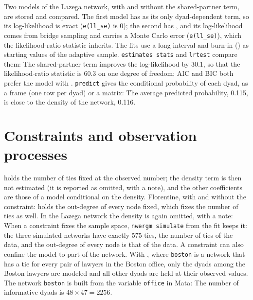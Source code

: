 Two models of the Lazega network, with and without the shared-partner term, are stored and compared. The first model has  as its only dyad-dependent term, so its log-likelihood is exact (\texttt{e(ll\_se)} is 0); the second has , and its log-likelihood comes from bridge sampling and carries a Monte Carlo error (\texttt{e(ll\_se)}), which the likelihood-ratio statistic inherits. The fits use a long interval and burn-in () as starting values of the adaptive sample.
\texttt{estimates stats} and \texttt{lrtest} compare them:
The shared-partner term improves the log-likelihood by 30.1, so that the likelihood-ratio statistic is 60.3 on one degree of freedom; AIC and BIC both prefer the model with . \texttt{predict} gives the conditional probability of each dyad, as a frame (one row per dyad) or a matrix:
The average predicted probability, 0.115, is close to the density of the network, 0.116.

\section{Constraints and observation processes}\label{sec:conex}

 holds the number of ties fixed at the observed number; the density term is then not estimated (it is reported as omitted, with a note), and the other coefficients are those of a model conditional on the density. Florentine, with and without the constraint:
 holds the out-degree of every node fixed, which fixes the number of ties as well. In the Lazega network the density is again omitted, with a note:
When a constraint fixes the sample space, \texttt{nwergm simulate} from the fit keeps it: the three simulated networks have exactly 575 ties, the number of ties of the data, and the out-degree of every node is that of the data.
A constraint can also confine the model to part of the network. With , where \texttt{boston} is a network that has a tie for every pair of lawyers in the Boston office, only the dyads among the Boston lawyers are modeled and all other dyads are held at their observed values. The network \texttt{boston} is built from the variable \texttt{office} in Mata:
The number of informative dyads is $48\times47=2256$.

